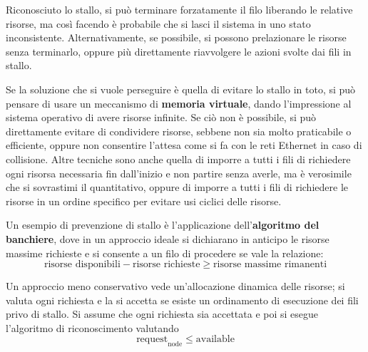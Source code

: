 \noindent Riconosciuto lo stallo, si può terminare forzatamente il filo liberando le relative risorse, ma così facendo è probabile che si lasci il
sistema in uno stato inconsistente. Alternativamente, se possibile, si possono prelazionare le risorse senza terminarlo, oppure più direttamente
riavvolgere le azioni svolte dai fili in stallo.\par
Se la soluzione che si vuole perseguire è quella di evitare lo stallo in toto, si può pensare di usare un meccanismo di \textbf{memoria virtuale}, dando
l'impressione al sistema operativo di avere risorse infinite. Se ciò non è possibile, si può direttamente evitare di condividere risorse, sebbene non
sia molto praticabile o efficiente, oppure non consentire l'attesa come si fa con le reti Ethernet in caso di collisione. Altre tecniche sono anche
quella di imporre a tutti i fili di richiedere ogni risorsa necessaria fin dall'inizio e non partire senza averle, ma è verosimile che si sovrastimi il
quantitativo, oppure di imporre a tutti i fili di richiedere le risorse in un ordine specifico per evitare usi ciclici delle risorse.\par
Un esempio di prevenzione di stallo è l'applicazione dell'\textbf{algoritmo del banchiere}, dove in un approccio ideale si dichiarano in anticipo le
risorse massime richieste e si consente a un filo di procedere se vale la relazione: \[
    \text{risorse disponibili} - \text{risorse richieste} \geq \text{risorse massime rimanenti}
\]

\noindent Un approccio meno conservativo vede un'allocazione dinamica delle risorse; si valuta ogni richiesta e la si accetta se esiste un ordinamento
di esecuzione dei fili privo di stallo. Si assume che ogni richiesta sia accettata e poi si esegue l'algoritmo di riconoscimento valutando \[
    \text{request}_{\text{node}} \leq \text{available}
\]

